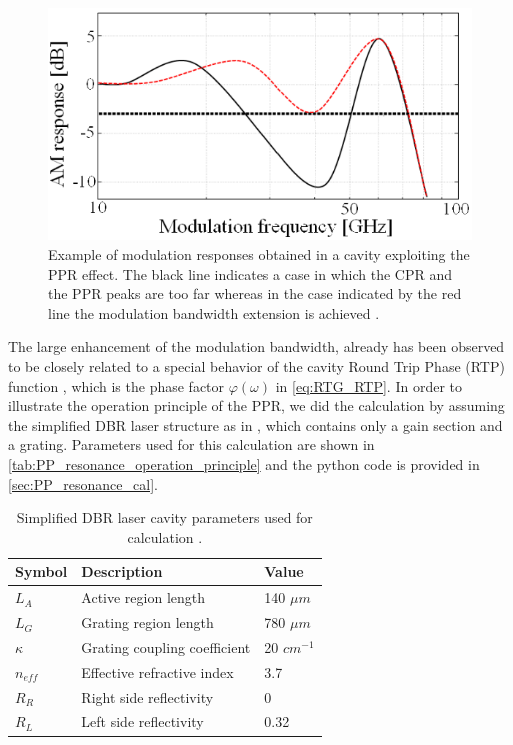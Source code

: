 \begin{figure}[ht]
    \centering
    \includegraphics[width=.6\linewidth]{figures/PP_resonance_in_modulation_response.png}
    \caption{Example of modulation responses obtained in a cavity exploiting the PPR effect. The black line indicates a case in which the CPR and the PPR peaks are too far whereas in the case indicated by the red line the modulation bandwidth extension is achieved \cite{montrosset2014laser}.}
    \label{fig:PP_resonance_in_modulation_response}
\end{figure}

The large enhancement of the modulation bandwidth, already has been observed to be closely related to a special behavior of the cavity Round Trip Phase (RTP) function \cite{reithmaier2005modulation}, which is the phase factor $\varphi(\omega)$ in \autoref{eq:RTG_RTP}. In order to illustrate the operation principle of the PPR, we did the calculation by assuming the simplified DBR laser structure as in \cite{montrosset2014laser}, which contains only a gain section and a grating. Parameters used for this calculation are shown in \autoref{tab:PP_resonance_operation_principle} and the python code is provided in \autoref{sec:PP_resonance_cal}.

\begin{table}[ht]
    \centering
    \caption{Simplified DBR laser cavity parameters used for calculation \cite{montrosset2014laser}.}
    \label{tab:PP_resonance_operation_principle}
    \begin{tabular}{@{}lll@{}}
    \toprule
    Symbol    & Description                  & Value        \\ \midrule
    $L_A$     & Active region length         & 140 $\mu m$  \\
    $L_G$     & Grating region length        & 780 $\mu m$  \\
    $\kappa$  & Grating coupling coefficient & 20 $cm^{-1}$ \\
    $n_{eff}$ & Effective refractive index   & 3.7          \\
    $R_R$     & Right side reflectivity      & 0            \\
    $R_L$     & Left side reflectivity       & 0.32         \\ \bottomrule
    \end{tabular}
\end{table}

